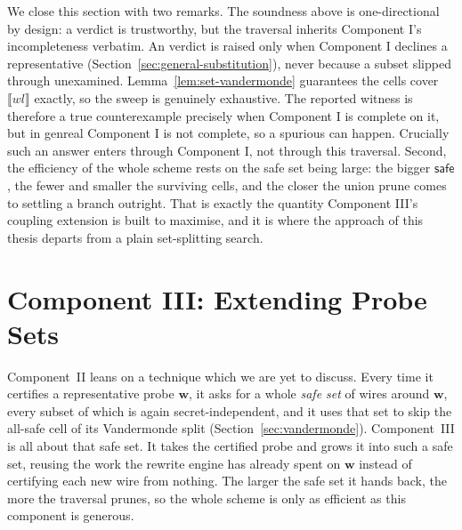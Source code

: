   We close this section with two remarks. The soundness above is one-directional by design:
  a \Secure{} verdict is trustworthy, but the traversal inherits Component
  I's incompleteness verbatim. An \Insecure{} verdict is
  raised only when Component I declines a representative
  (Section~\ref{sec:general-substitution}), never because a subset slipped through
  unexamined. Lemma~\ref{lem:set-vandermonde} guarantees the cells cover
  $\llbracket wl \rrbracket$ exactly, so the sweep is genuinely exhaustive. The
  reported witness is therefore a true counterexample precisely when Component I is
  complete on it, but in genreal Component I is not complete, so a spurious \Insecure{}
  can happen. Crucially such an \Insecure{} answer enters through Component
  I, not through this traversal. Second, the efficiency of the whole scheme rests
  on the safe set being large: the bigger $\mathsf{safe}$, the fewer and smaller
  the surviving cells, and the closer the union prune comes to settling a branch
  outright. That is exactly the quantity Component III's coupling extension is built
  to maximise, and it is where the approach of this thesis departs from a plain
  set-splitting search.

\section{Component III: Extending Probe Sets}
\label{sec:extension}

Component~II leans on a technique which we are yet to discuss. Every time it certifies
a representative probe $\mathbf{w}$, it asks for a whole \emph{safe set} of wires
around $\mathbf{w}$, every subset of which is again secret-independent, and it uses
that set to skip the all-safe cell of its Vandermonde split
(Section~\ref{sec:vandermonde}). Component~III is all about that safe set. It takes
the certified probe and grows it into such a safe set, reusing the work the rewrite
engine has already spent on $\mathbf{w}$ instead of certifying each new wire from
nothing. The larger the safe set it hands back, the more the traversal prunes, so
the whole scheme is only as efficient as this component is generous.

